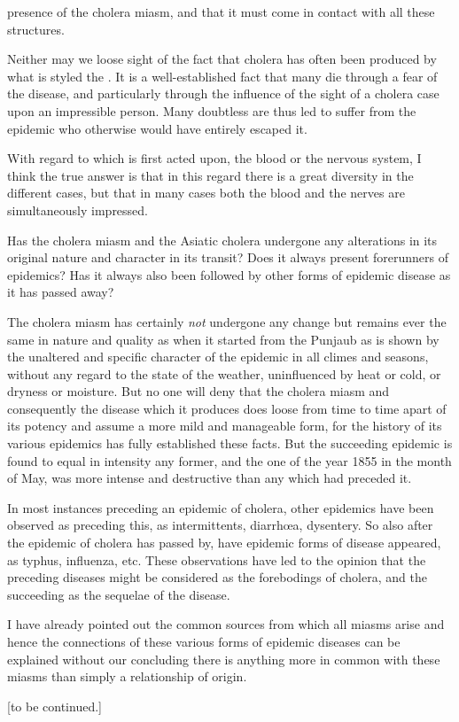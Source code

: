 presence of the cholera miasm, and that it must come in contact with
all these structures.

Neither may we loose sight of the fact that cholera has often been
produced by what is styled the . It is a well-established
fact that many die through a fear of the disease, and particularly
through the influence of the sight of a cholera case upon an
impressible person. Many doubtless are thus led to suffer from the
epidemic who otherwise would have entirely escaped it.

With regard to which is first acted upon, the blood or the nervous
system, I think the true answer is that in this regard there is a great
diversity in the different cases, but that in many cases both the blood
and the nerves are simultaneously impressed.

\vspace{\baselineskip}

Has the cholera miasm and the Asiatic cholera undergone any alterations
in its original nature and character in its transit? Does it always
present forerunners of epidemics? Has it always also been followed by
other forms of epidemic disease as it has passed away?

The cholera miasm has certainly \emph{not} undergone any change but remains
ever the same in nature and quality as when it started from the
Punjaub as is shown by the unaltered and specific character of the epidemic
in all climes and seasons, without any regard to the state of the
weather, uninfluenced by heat or cold, or dryness or moisture. But no
one will deny that the cholera miasm and consequently the disease
which it produces does loose from time to time apart of its potency and
assume a more mild and manageable form, for the history of its various
epidemics has fully established these facts. But the succeeding epidemic
is found to equal in intensity any former, and the one of the year
1855 in the month of May, was more intense and destructive than any
which had preceded it.

In most instances preceding an epidemic of cholera, other epidemics
have been observed as preceding this, as intermittents, diarrhœa, dysentery.
So also after the epidemic of cholera has passed by, have
epidemic forms of disease appeared, as typhus, influenza, etc. These
observations have led to the opinion that the preceding diseases might
be considered as the forebodings of cholera, and the succeeding as the
sequelae of the disease.

I have already pointed out the common sources from which all
miasms arise and hence the connections of these various forms of epidemic
diseases can be explained without our concluding there is anything
more in common with these miasms than simply a relationship
of origin.

[to be continued.]\endinput